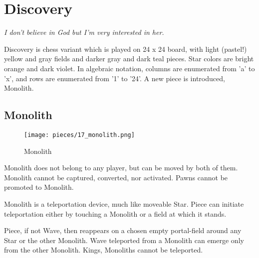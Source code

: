 

\chapter*{Discovery}

\begin{flushright}
\parbox{0.8\textwidth}{
\emph{I don't believe in God but I'm very interested in her. \\
 } }
\end{flushright}

\noindent
Discovery is chess variant which is played on 24 x 24 board, with
light (pastel!) yellow and gray fields and darker gray and dark teal
pieces. Star colors are bright orange and dark violet. In algebraic
notation, columns are enumerated from 'a' to 'x', and rows are
enumerated from '1' to '24'. A new piece is introduced, Monolith.

\clearpage %

\section*{Monolith}

\noindent
\begin{wrapfigure}[11]{l}{0.4\textwidth}
\centering
\texttt{[image: pieces/17\_monolith.png]}
\caption{Monolith}
\label{fig:17_monolith}
\end{wrapfigure}
Monolith does not belong to any player, but can be moved by both of them.
Monolith cannot be captured, converted, nor activated.
Pawns cannot be promoted to Monolith.

Monolith is a teleportation device, much like moveable Star. Piece can
initiate teleportation either by touching a Monolith or a field at which
it stands.

Piece, if not Wave, then reappears on a chosen empty portal-field around
any Star or the other Monolith. Wave teleported from a Monolith can emerge
only from the other Monolith. Kings, Monoliths cannot be teleported.

